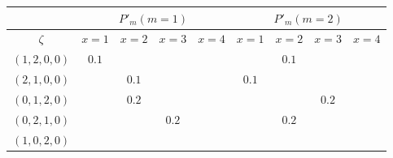 \documentclass[11pt,letterpaper]{article}
\begin{document}
\begin{table}[]
\centering
\begin{tabular}{c||cccc||cccc}

            & \multicolumn{4}{c||}{$P'_m (m=1)$}                                                            & \multicolumn{4}{c}{$P'_m (m=2)$}                                                                          \\ \hline
$\zeta$     & \multicolumn{1}{c|}{$x=1$}                                           & \multicolumn{1}{c|}{$x=2$}                    & \multicolumn{1}{c|}{$x=3$}                    & $x=4$                    & \multicolumn{1}{c|}{$x=1$}                    & \multicolumn{1}{c|}{$x=2$}                    & \multicolumn{1}{c|}{$x=3$}                    & $x=4$                    \\ \hline \hline
$(1,2,0,0)$ & \multicolumn{1}{c|}{\cellcolor{yellow!25}$0.1$} & \multicolumn{1}{c|}{}                         & \multicolumn{1}{c|}{}                         &                          & \multicolumn{1}{c|}{}                         & \multicolumn{1}{c|}{\cellcolor{yellow!25}$0.1$} & \multicolumn{1}{c|}{}                         &                          \\ \hline
$(2,1,0,0)$ & \multicolumn{1}{c|}{}                                                & \multicolumn{1}{c|}{\cellcolor{yellow!25}$0.1$} & \multicolumn{1}{c|}{}                         &                          & \multicolumn{1}{c|}{\cellcolor{yellow!25}$0.1$} & \multicolumn{1}{c|}{}                         & \multicolumn{1}{c|}{}                         &                          \\ \hline
$(0,1,2,0)$ & \multicolumn{1}{c|}{}                                                & \multicolumn{1}{c|}{\cellcolor{yellow!25}$0.2$} & \multicolumn{1}{c|}{}                         &                          & \multicolumn{1}{c|}{}                         & \multicolumn{1}{c|}{}                         & \multicolumn{1}{c|}{\cellcolor{yellow!25}$0.2$} &                          \\ \hline
$(0,2,1,0)$ & \multicolumn{1}{c|}{}                                                & \multicolumn{1}{c|}{}                         & \multicolumn{1}{c|}{\cellcolor{yellow!25}$0.2$} &                          & \multicolumn{1}{c|}{}                         & \multicolumn{1}{c|}{\cellcolor{yellow!25}$0.2$} & \multicolumn{1}{c|}{}                         &                          \\ \hline
$(1,0,2,0)$ & \multicolumn{1}{c|}{\cellcolor{yellow!25}}                        & \multicolumn{1}{c|}{}                         & \multicolumn{1}{c|}{}                         &                          & \multicolumn{1}{c|}{}                         & \multicolumn{1}{c|}{}                         & \multicolumn{1}{c|}{\cellcolor{yellow!25}} &                          \\ \hline

\end{tabular}
\end{table}
\end{document}
